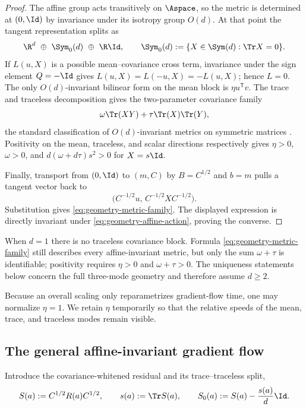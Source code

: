 \begin{proof}
The affine group acts transitively on $\Aspace$, so the metric is determined
at $(0,\Id)$ by invariance under its isotropy group $O(d)$.  At that point the
tangent representation splits as
\[
    \R^d\ \oplus\ \Sym_0(d)\ \oplus\ \R\Id,
    \qquad
    \Sym_0(d):=\{X\in\Sym(d):\Tr X=0\}.
\]
If $L(u,X)$ is a possible mean--covariance cross term, invariance under the
sign element $Q=-\Id$ gives $L(u,X)=L(-u,X)=-L(u,X)$; hence $L=0$.
The only $O(d)$-invariant bilinear form on the mean block is
$\eta u^{\mathsf T}v$.  The trace and traceless decomposition gives the
two-parameter covariance family
\[
    \omega\Tr(XY)+\tau\Tr(X)\Tr(Y),
\]
the standard classification of $O(d)$-invariant metrics on symmetric
matrices \citep{thanwerdas2019affine,thanwerdas2023n}.  Positivity on the
mean, traceless, and scalar directions respectively gives
$\eta>0$, $\omega>0$, and
$d(\omega+d\tau)s^2>0$ for $X=s\Id$.

Finally, transport from $(0,\Id)$ to $(m,C)$ by $B=C^{1/2}$ and $b=m$
pulls a tangent vector back to
\[
    \bigl(C^{-1/2}u,\,C^{-1/2}XC^{-1/2}\bigr).
\]
Substitution gives \eqref{eq:geometry-metric-family}.  The displayed
expression is directly invariant under \eqref{eq:geometry-affine-action},
proving the converse.
\end{proof}

\begin{remark}
\label{rem:geometry-dimension-one}
When $d=1$ there is no traceless covariance block.  Formula
\eqref{eq:geometry-metric-family} still describes every affine-invariant
metric, but only the sum $\omega+\tau$ is identifiable; positivity requires
$\eta>0$ and $\omega+\tau>0$.  The uniqueness statements below concern the
full three-mode geometry and therefore assume $d\geq2$.
\end{remark}

Because an overall scaling only reparametrizes gradient-flow time, one may
normalize $\eta=1$.  We retain $\eta$ temporarily so that the relative speeds
of the mean, trace, and traceless modes remain visible.

\subsection{The general affine-invariant gradient flow}
\label{sec:geometry-general-flow}

Introduce the covariance-whitened residual and its trace--traceless split,
\begin{equation}
\label{eq:geometry-residual-split}
    S(a):=C^{1/2}R(a)C^{1/2},
    \qquad
    s(a):=\Tr S(a),
    \qquad
    S_0(a):=S(a)-\frac{s(a)}d\Id.
\end{equation}

